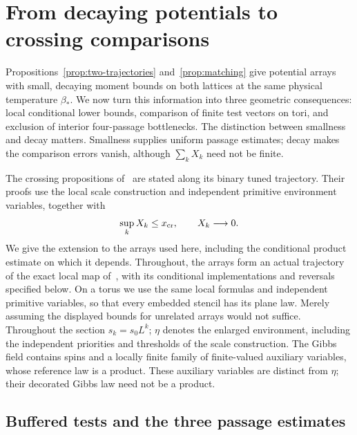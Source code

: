 \section{From decaying potentials to crossing comparisons}
\label{sec:crossings}

Propositions~\ref{prop:two-trajectories} and~\ref{prop:matching} give
potential arrays with small, decaying moment bounds on both lattices at the same physical
temperature $\beta_*$.  We now turn this information into three geometric
consequences: local conditional lower bounds, comparison of finite test
vectors on tori, and exclusion of interior four-passage bottlenecks.
The distinction between smallness and decay matters.  Smallness supplies
uniform passage estimates; decay makes the comparison errors vanish,
although $\sum_k X_k$ need not be finite.

The crossing propositions of~\cite[Section~7]{R} are stated along its
binary tuned trajectory.  Their proofs use the local scale construction
and independent primitive environment variables, together with
\begin{equation}
 \sup_k X_k\leq x_{\rm cr},\qquad X_k\longrightarrow0.
 \label{eq:crossing-hypothesis}
\end{equation}
We give the extension to the arrays used here, including the conditional
product estimate on which it depends.  Throughout, the arrays form an
actual trajectory of the exact local map of~\cite[Section~3]{R}, with
its conditional implementations and reversals specified below.  On a
torus we use the same local formulas and independent primitive variables,
so that every embedded stencil has its plane law.  Merely assuming the
displayed bounds for unrelated arrays would not suffice.
Throughout the section $s_k=s_0L^k$;
$\eta$ denotes the enlarged environment, including the independent
priorities and thresholds of the scale construction.  The Gibbs field
contains spins and a locally finite family of finite-valued auxiliary
variables, whose reference law is a product.  These auxiliary variables
are distinct from $\eta$; their decorated Gibbs law need not be a product.

\subsection{Buffered tests and the three passage estimates}

